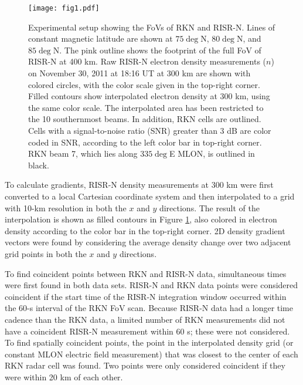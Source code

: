 \begin{figure}
	\texttt{[image: fig1.pdf]}
  \caption{Experimental setup showing the FoVs of RKN and RISR-N. Lines of constant magnetic latitude are shown at \(75\deg\)N, \(80\deg\)N, and \(85\deg\)N. The pink outline shows the footprint of the full FoV of RISR-N at 400 km.  Raw RISR-N electron density measurements (\(n\)) on November 30, 2011 at 18:16 UT at 300 km are shown with colored circles, with the color scale given in the top-right corner.  Filled contours show interpolated electron density at 300 km, using the same color scale.  The interpolated area has been restricted to the 10 southernmost beams. In addition, RKN cells are outlined.  Cells with a signal-to-noise ratio (SNR) greater than 3 dB are color coded in SNR, according to the left color bar in top-right corner. RKN beam 7, which lies along \(335\deg\)E MLON, is outlined in black.}
  \label{fig:f1}
\end{figure}

To calculate gradients, RISR-N density measurements at 300 km were first converted to a local Cartesian coordinate system and then interpolated to a grid with 10-km resolution in both the \(x\) and \(y\) directions.  The result of the interpolation is shown as filled contours in Figure \ref{fig:f1}, also colored in electron density according to the color bar in the top-right corner.  2D density gradient vectors were found by considering the average density change over two adjacent grid points in both the \(x\) and \(y\) directions.


To find coincident points between RKN and RISR-N data, simultaneous times were first found in both data sets.  RISR-N and RKN data points were considered coincident if the start time of the RISR-N integration window occurred within the 60-s interval of the RKN FoV scan.  Because RISR-N data had a longer time cadence than the RKN data, a limited number of RKN measurements did not have a coincident RISR-N measurement within 60 s; these were not considered. To find spatially coincident points, the point in the interpolated density grid (or constant MLON electric field measurement) that was closest to the center of each RKN radar cell was found.  Two points were only considered coincident if they were within 20 km of each other.

